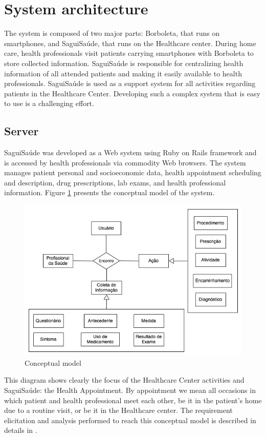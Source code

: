 \documentclass[12pt]{article}
\begin{document}
\section{System architecture}
The system is composed of two major parts: Borboleta, that runs on smartphones, and SaguiSaúde, that runs on the Healthcare center. During home care, health professionals visit patients carrying smartphones with Borboleta to store collected information. SaguiSaúde is responsible for centralizing health information of all attended patients and making it easily available to health professionals. SaguiSaúde is used as a support system for all activities regarding patients in the Healthcare Center. Developing such a complex system that is easy to use is a challenging effort.


\subsection{Server}
SaguiSaúde was developed as a Web system using Ruby on Rails framework and is accessed by health professionals via commodity Web browsers. The system manages patient personal and socioeconomic data, health appointment scheduling and description, drug prescriptions, lab exams, and health professional information. Figure \ref{dataModel} presents the conceptual model of the system.

\begin{figure}[ht]
\centering
\includegraphics[width=.60\textwidth]{images/ModeloConceitualSagui.jpg}
\caption{Conceptual model}
\label{dataModel}
\end{figure}


This diagram shows clearly the focus of the Healthcare Center activities and SaguiSaúde: the Health Appointment. By appointment we mean all occasions in which patient and health professional meet each other, be it in the patient's home due to a routine visit, or be it in the Healthcare center. The requirement elicitation and analysis performed to reach this conceptual model is described in details in \cite{sagui}.
\end{document}
